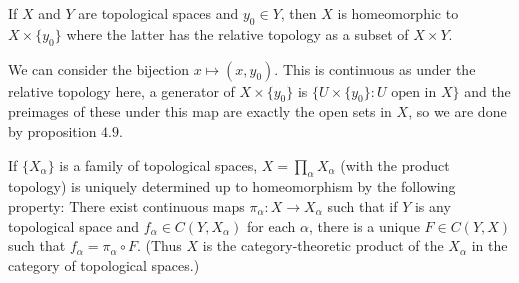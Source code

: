 \documentclass[12pt,a4paper]{article}
\begin{document}
\begin{problem}\label{prob:4-18}
If $X$ and $Y$ are topological spaces and $y_0 \in Y$, then $X$ is homeomorphic to $X \times \{y_0\}$ where the latter has the relative topology as a subset of $X \times Y$.
\end{problem}
\begin{solution}
We can consider the bijection $x\mapsto (x,y_0)$. 
This is continuous as under the relative topology here, a generator of $X\times\{y_0\}$ is $\{U\times\{y_0\}:U\text{ open in }X\}$ and the preimages of these under this map are exactly the open sets in $X$, so we are done by proposition $4.9$. 
\end{solution}
\begin{problem}\label{prob:4-19}
If $\{X_\alpha\}$ is a family of topological spaces, $X = \prod_{\alpha} X_\alpha$ (with the product topology) is uniquely determined up to homeomorphism by the following property: There exist continuous maps $\pi_\alpha : X \to X_\alpha$ such that if $Y$ is any topological space and $f_\alpha \in C(Y,X_\alpha)$ for each $\alpha$, there is a unique $F \in C(Y,X)$ such that $f_\alpha = \pi_\alpha \circ F$. (Thus $X$ is the category-theoretic product of the $X_\alpha$ in the category of topological spaces.)
\end{problem}
\end{document}
